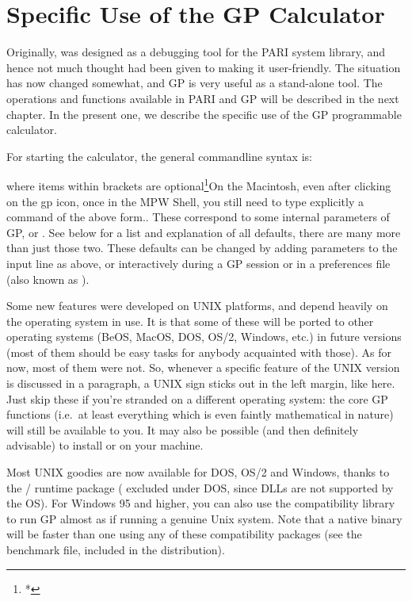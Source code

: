 %
%
\chapter{Specific Use of the GP Calculator}

Originally,  was designed as a debugging tool for the PARI system
library, and hence not much thought had been given to making it
user-friendly. The situation has now changed somewhat, and GP is very
useful as a stand-alone tool. The operations and functions available in
PARI and GP will be described in the next chapter. In the present one, we
describe the specific use of the GP programmable calculator.

For starting the calculator, the general commandline syntax is:


\noindent
where items within brackets are optional\footnote{*}{On the Macintosh, even
after clicking on the gp icon, once in the MPW Shell, you still need to type
explicitly a command of the above form.}. These correspond to some internal
parameters of GP, or . See  below for a
list and explanation of all defaults, there are many more than just those
two. These defaults can be changed by adding parameters to the input line
as above, or interactively during a GP session or in a preferences file (also
known as ).

\unix Some new features were developed on UNIX platforms, and depend heavily
on the operating system in use. It is  that some of these
will be ported to other operating systems (BeOS, MacOS, DOS, OS/2, Windows,
etc.) in future versions (most of them should be easy tasks for anybody
acquainted with those). As for now, most of them were not. So, whenever a
specific feature of the UNIX version is discussed in a paragraph, a UNIX sign
sticks out in the left margin, like here. Just skip these if you're stranded
on a different operating system: the core GP functions (i.e.~at least
everything which is even faintly mathematical in nature) will still be
available to you. It may also be possible (and then definitely advisable) to
install  or  on your machine.

 Most UNIX goodies are now
available for DOS, OS/2 and Windows, thanks to the /
runtime package ( excluded under DOS, since DLLs are not
supported by the OS). For Windows 95 and higher, you can also use the
 compatibility library to run GP almost as if running a genuine
Unix system. Note that a native  binary will be faster than one
using any of these compatibility packages (see the  benchmark
file, included in the distribution).


